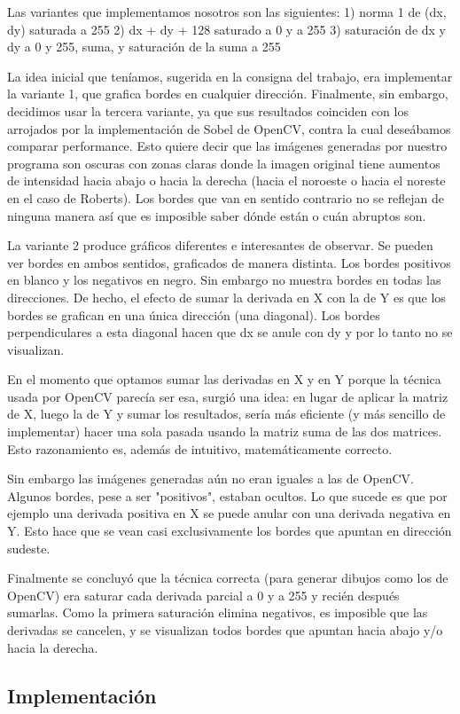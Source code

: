 Las variantes que implementamos nosotros son las siguientes:
    1) norma 1 de (dx, dy) saturada a 255
    2) dx + dy + 128 saturado a 0 y a 255
    3) saturación de dx y dy a 0 y 255, suma, y saturación de la suma a 255

La idea inicial que teníamos, sugerida en la consigna del trabajo, era implementar la variante 1, que grafica bordes en cualquier dirección. Finalmente, sin embargo, decidimos usar la tercera variante, ya que sus resultados coinciden con los arrojados por la implementación de Sobel de OpenCV, contra la cual deseábamos comparar performance. Esto quiere decir que las imágenes generadas por nuestro programa son oscuras con zonas claras donde la imagen original tiene aumentos de intensidad hacia abajo o hacia la derecha (hacia el noroeste o hacia el noreste en el caso de Roberts). Los bordes que van en sentido contrario no se reflejan de ninguna manera así que es imposible saber dónde están o cuán abruptos son.

La variante 2 produce gráficos diferentes e interesantes de observar. Se pueden ver bordes en ambos sentidos, graficados de manera distinta. Los bordes positivos en blanco y los negativos en negro. Sin embargo no muestra bordes en todas las direcciones. De hecho, el efecto de sumar la derivada en X con la de Y es que los bordes se grafican en una única dirección (una diagonal). Los bordes perpendiculares a esta diagonal hacen que dx se anule con dy y por lo tanto no se visualizan.

En el momento que optamos sumar las derivadas en X y en Y porque la técnica usada por OpenCV parecía ser esa, surgió una idea: en lugar de aplicar la matriz de X, luego la de Y y sumar los resultados, sería más eficiente (y más sencillo de implementar) hacer una sola pasada usando la matriz suma de las dos matrices. Esto razonamiento es, además de intuitivo, matemáticamente correcto.

Sin embargo las imágenes generadas aún no eran iguales a las de OpenCV. Algunos bordes, pese a ser "positivos", estaban ocultos. Lo que sucede es que por ejemplo una derivada positiva en X se puede anular con una derivada negativa en Y. Esto hace que se vean casi exclusivamente los bordes que apuntan en dirección sudeste.

Finalmente se concluyó que la técnica correcta (para generar dibujos como los de OpenCV) era saturar cada derivada parcial a 0 y a 255 y recién después sumarlas. Como la primera saturación elimina negativos, es imposible que las derivadas se cancelen, y se visualizan todos bordes que apuntan hacia abajo y/o hacia la derecha.


\subsection{Implementación}





